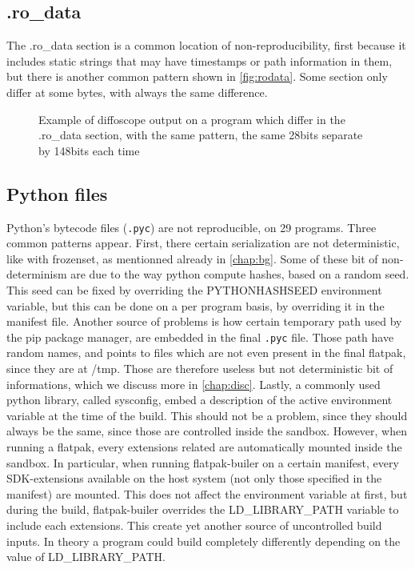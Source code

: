 \documentclass[a4paper,11pt,oneside]{report}
\theoremstyle{definition}
\newcommand{\fp}{flatpak\xspace}
\newcommand{\fb}{flatpak-builer\xspace}
\newcommand{\ldlp}{LD\_LIBRARY\_PATH\xspace}
\newcommand{\dfc}{diffoscope\xspace}
\begin{document}
\subsection*{.ro\_data}
The .ro\_data section is a common location of non-reproducibility, first
because it includes static strings that may have timestamps or path information
in them, but there is another common pattern shown in \autoref{fig:rodata}.
Some section only differ at some bytes, with always the same difference.
\begin{figure}[h]
    \caption{Example of \dfc output on a program which differ in the .ro\_data section, with the same pattern, the same 28bits separate by 148bits each time}
    \label{fig:rodata}
\end{figure}

\subsection*{Python files}
Python's bytecode files (\verb|.pyc|) are not reproducible, on 29 programs.
Three common patterns appear. First, there certain serialization are not
deterministic, like with frozenset, as mentionned already in \autoref{chap:bg}.
Some of these bit of non-determinism are due to the way python compute hashes,
based on a random seed. This seed can be fixed by overriding the PYTHONHASHSEED
environment variable, but this can be done on a per program basis, by
overriding it in the manifest file. Another source of problems is how certain
temporary path used by the pip package manager, are embedded in the final
\verb|.pyc| file. Those path have random names, and points to files which are
not even present in the final \fp, since they are at /tmp. Those are therefore
useless but not deterministic bit of informations, which we discuss more in
\autoref{chap:disc}.
Lastly, a commonly used python library, called sysconfig, embed a description
of the active environment variable at the time of the build. This should not be
a problem, since they should always be the same, since those are controlled
inside the sandbox. However, when running a \fp, every extensions related are
automatically mounted inside the sandbox. In particular, when running \fb on a
certain manifest, every SDK-extensions available on the host system (not only
those specified in the manifest) are mounted. This does not affect the
environment variable at first, but during the build, \fb overrides the
\ldlp variable to include each extensions. This create yet another
source of uncontrolled build inputs. In theory a program could build completely
differently depending on the value of \ldlp.
\end{document}
